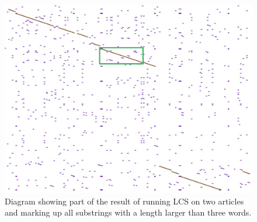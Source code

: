 \begin{figure}
	\includegraphics[scale=0.5]{figures/SubstringCollection}
	\caption{Diagram showing part of the result of running LCS on two articles and marking up all substrings with a length larger than three words.}
	\end{figure}